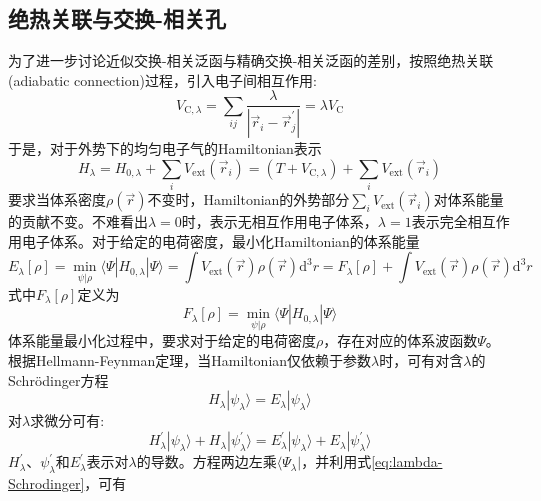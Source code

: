\subsection{绝热关联与交换-相关孔}
为了进一步讨论近似交换-相关泛函与精确交换-相关泛函的差别，按照绝热关联\textrm{(adiabatic connection)}过程，引入电子间相互作用:
\begin{equation}
	V_{\mathrm{C},\lambda}=\sum_{ij}\dfrac{\lambda}{|\vec r_i-\vec r^{\prime}_j|}=\lambda V_{\mathrm{C}}
	\label{eq:electron-electron}
\end{equation}
于是，对于外势下的均匀电子气的\textrm{Hamiltonian}表示
\begin{equation}
	H_{\lambda}=H_{0,\lambda}+\sum_iV_{\mathrm{ext}}(\vec r_i)=(T+V_{\mathrm{C},\lambda})+\sum_iV_{\mathrm{ext}}(\vec r_i)
	\label{eq:H-interaction}
\end{equation}
要求当体系密度$\rho(\vec r)$不变时，\textrm{Hamiltonian}的外势部分$\sum\limits_iV_{\mathrm{ext}}(\vec r_i)$对体系能量的贡献不变。不难看出$\lambda=0$时，表示无相互作用电子体系，$\lambda=1$表示完全相互作用电子体系。对于给定的电荷密度，最小化\textrm{Hamiltonian}的体系能量
\begin{equation}
	E_{\lambda}[\rho]=\min_{\psi|\rho}\langle\Psi|H_{0,\lambda}|\Psi\rangle=\int V_{\mathrm{ext}}(\vec r)\rho(\vec r)\mathrm{d}^3r=F_{\lambda}[\rho]+\int V_{\mathrm{ext}}(\vec r)\rho(\vec r)\mathrm{d}^3 r
	\label{eq:min-E}
\end{equation}
式中$F_{\lambda}[\rho]$定义为
\begin{equation}
	F_{\lambda}[\rho]=\min_{\psi|\rho}\langle\Psi|H_{0,\lambda}|\Psi\rangle
	\label{eq:General-Functional-lambda}
\end{equation}
体系能量最小化过程中，要求对于给定的电荷密度$\rho$，存在对应的体系波函数$\Psi$。根据\textrm{Hellmann-Feynman}定理\cite{Hellmann_Book,PR56-340_1939}，当\textrm{Hamiltonian}仅依赖于参数$\lambda$时，可有对含$\lambda$的\textrm{Schr\"odinger}方程
\begin{equation}
	H_{\lambda}|\psi_{\lambda}\rangle=E_{\lambda}|\psi_{\lambda}\rangle
	\label{eq:lambda-Schrodinger}
\end{equation}
对$\lambda$求微分可有:
\begin{equation}
	H_{\lambda}^{\prime}|\psi_{\lambda}\rangle+H_{\lambda}|\psi_{\lambda}^{\prime}\rangle=E_{\lambda}^{\prime}|\psi_{\lambda}\rangle+E_{\lambda}|\psi_{\lambda}^{\prime}\rangle
	\label{eq:Hellmann-Feynman}
\end{equation}
$H_{\lambda}^{\prime}$、$\psi_{\lambda}^{\prime}$和$E_{\lambda}^{\prime}$表示对$\lambda$的导数。方程两边左乘$\langle\Psi_{\lambda}|$，并利用式\eqref{eq:lambda-Schrodinger}，可有
